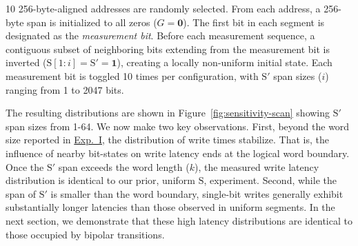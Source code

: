 10 256-byte-aligned addresses are randomly selected. From each address, a 256-byte span is initialized to all zeros ($G=\mathbf{0}$).  
The first bit in each segment is designated as the \emph{measurement bit}.  
Before each measurement sequence, a contiguous subset of neighboring bits extending from the measurement bit is inverted ($\mathrm{S}[1:i] = \mathrm{S}' = \mathbf{1}$), creating a locally non-uniform initial state.  
Each measurement bit is toggled 10 times per configuration, with $\mathrm{S}'$ span sizes ($i$) ranging from 1 to 2047 bits.

The resulting distributions are shown in Figure~\ref{fig:sensitivity-scan} showing $\mathrm{S}'$ span sizes from 1-64. We now make two key observations. First, beyond the word size reported in \hyperref[exp:i]{Exp.~I}, the distribution of write times stabilize.
That is, the influence of nearby bit-states on write latency ends at the logical word boundary.  
Once the $\mathrm{S}'$ span exceeds the word length ($k$), the measured write latency distribution is identical to our prior, uniform $\mathrm{S}$, experiment.
Second, while the span of $\mathrm{S}'$ is smaller than the word boundary, single-bit writes generally exhibit substantially longer latencies than those observed in uniform segments. In the next section, we demonstrate that these high latency distributions are identical to those occupied by bipolar transitions.




\label{sec:1byte}
\label{exp:iv}

